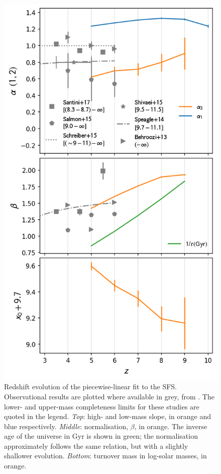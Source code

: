 \begin{figure}
	\includegraphics[width=\columnwidth]{images/sfs_fit_evolution.png}
    \caption{Redshift evolution of the piecewise-linear fit to the SFS.
    Observational results are plotted where available in grey, from \protect\cite{behroozi_average_2013,speagle_highly_2014,shivaei_mosdef_2015,salmon_relation_2015,schreiber_herschel_2015,santini_star_2017}.
    The lower- and upper-mass completeness limits for these studies are quoted in the legend.
    \textit{Top}: high- and low-mass slope, in orange and blue respectively.
    \textit{Middle}: normalisation, $\beta$, in orange.
    The inverse age of the universe in Gyr is shown in green; the normalisation approximately follows the same relation, but with a slightly shallower evolution.
    \textit{Bottom}: turnover mass in log-solar masses, in orange.
    }
    \label{fig:sfs_fit_evolution}
\end{figure}


